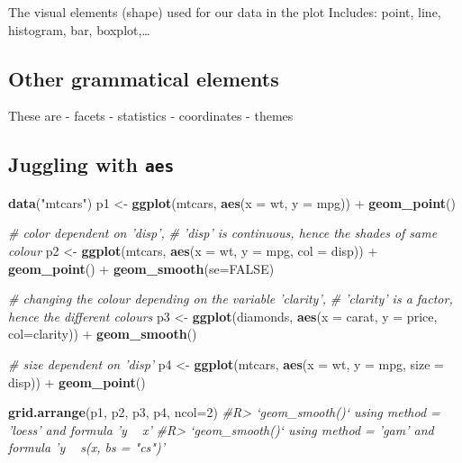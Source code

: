 \documentclass[]{book}
\newenvironment{Shaded}{}{}
\newcommand{\CommentTok}[1]{\textcolor[rgb]{0.38,0.63,0.69}{\textit{#1}}}
\newcommand{\DataTypeTok}[1]{\textcolor[rgb]{0.56,0.13,0.00}{#1}}
\newcommand{\DecValTok}[1]{\textcolor[rgb]{0.25,0.63,0.44}{#1}}
\newcommand{\KeywordTok}[1]{\textcolor[rgb]{0.00,0.44,0.13}{\textbf{#1}}}
\newcommand{\NormalTok}[1]{#1}
\newcommand{\OperatorTok}[1]{\textcolor[rgb]{0.40,0.40,0.40}{#1}}
\newcommand{\OtherTok}[1]{\textcolor[rgb]{0.00,0.44,0.13}{#1}}
\newcommand{\StringTok}[1]{\textcolor[rgb]{0.25,0.44,0.63}{#1}}
\theoremstyle{definition}
\theoremstyle{definition}
\theoremstyle{definition}
\theoremstyle{remark}
\begin{document}
The visual elements (shape) used for our data in the plot Includes:
point, line, histogram, bar, boxplot,\ldots{}

\hypertarget{other-grammatical-elements}{%
\subsection{Other grammatical
elements}\label{other-grammatical-elements}}

These are - facets - statistics - coordinates - themes

\hypertarget{juggling-with-aes}{%
\subsection{\texorpdfstring{Juggling with
\texttt{aes}}{Juggling with aes}}\label{juggling-with-aes}}

\begin{Shaded}
\begin{Highlighting}[]
\KeywordTok{data}\NormalTok{(}\StringTok{"mtcars"}\NormalTok{)}
\NormalTok{p1 <-}\StringTok{ }\KeywordTok{ggplot}\NormalTok{(mtcars, }\KeywordTok{aes}\NormalTok{(}\DataTypeTok{x =}\NormalTok{ wt, }\DataTypeTok{y =}\NormalTok{ mpg)) }\OperatorTok{+}
\StringTok{      }\KeywordTok{geom_point}\NormalTok{()}

\CommentTok{# color dependent on 'disp',}
\CommentTok{# 'disp' is continuous, hence the shades of same colour}
\NormalTok{p2 <-}\StringTok{ }\KeywordTok{ggplot}\NormalTok{(mtcars, }\KeywordTok{aes}\NormalTok{(}\DataTypeTok{x =}\NormalTok{ wt, }\DataTypeTok{y =}\NormalTok{ mpg, }\DataTypeTok{col =}\NormalTok{ disp)) }\OperatorTok{+}
\StringTok{      }\KeywordTok{geom_point}\NormalTok{()  }\OperatorTok{+}\StringTok{ }\KeywordTok{geom_smooth}\NormalTok{(}\DataTypeTok{se=}\OtherTok{FALSE}\NormalTok{)}

\CommentTok{# changing the colour depending on the variable 'clarity', }
\CommentTok{# 'clarity' is a factor, hence the different colours}
\NormalTok{p3 <-}\StringTok{ }\KeywordTok{ggplot}\NormalTok{(diamonds, }\KeywordTok{aes}\NormalTok{(}\DataTypeTok{x =}\NormalTok{ carat, }\DataTypeTok{y =}\NormalTok{ price, }\DataTypeTok{col=}\NormalTok{clarity)) }\OperatorTok{+}
\StringTok{      }\KeywordTok{geom_smooth}\NormalTok{()}

\CommentTok{# size dependent on 'disp'}
\NormalTok{p4 <-}\StringTok{ }\KeywordTok{ggplot}\NormalTok{(mtcars, }\KeywordTok{aes}\NormalTok{(}\DataTypeTok{x =}\NormalTok{ wt, }\DataTypeTok{y =}\NormalTok{ mpg, }\DataTypeTok{size =}\NormalTok{ disp)) }\OperatorTok{+}
\StringTok{      }\KeywordTok{geom_point}\NormalTok{()}

\KeywordTok{grid.arrange}\NormalTok{(p1, p2, p3, p4, }\DataTypeTok{ncol=}\DecValTok{2}\NormalTok{)}
\CommentTok{#R> `geom_smooth()` using method = 'loess' and formula 'y ~ x'}
\CommentTok{#R> `geom_smooth()` using method = 'gam' and formula 'y ~ s(x, bs = "cs")'}
\end{Highlighting}
\end{Shaded}
\end{document}
